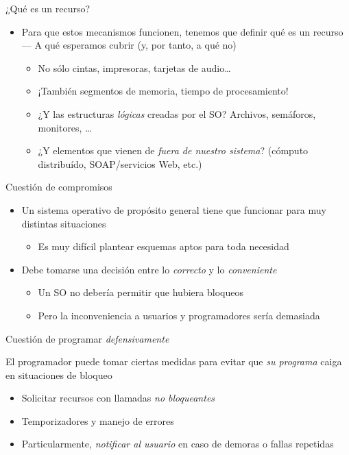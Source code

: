 \documentclass[presentation]{beamer}
\begin{document}
\begin{frame}[label={sec:org2c779b0}]{¿Qué es un recurso?}
\begin{itemize}
\item Para que estos mecanismos funcionen, tenemos que definir qué es un
recurso — A qué esperamos cubrir (y, por tanto, a qué no)
\begin{itemize}
\item No sólo cintas, impresoras, tarjetas de audio\ldots{}
\item ¡También segmentos de memoria, tiempo de procesamiento!
\item ¿Y las estructuras \emph{lógicas} creadas por el SO? Archivos,
semáforos, monitores, \ldots{}
\item ¿Y elementos que vienen de \emph{fuera de nuestro sistema}? (cómputo
distribuído, SOAP/servicios Web, etc.)
\end{itemize}
\end{itemize}
\end{frame}

\begin{frame}[label={sec:orge0f9685}]{Cuestión de compromisos}
\begin{itemize}
\item Un sistema operativo de propósito general tiene que funcionar para
muy distintas situaciones
\begin{itemize}
\item Es muy difícil plantear esquemas aptos para toda necesidad
\end{itemize}
\item Debe tomarse una decisión entre lo \emph{correcto} y lo \emph{conveniente}
\begin{itemize}
\item Un SO no debería permitir que hubiera bloqueos
\item Pero la inconveniencia a usuarios y programadores sería demasiada
\end{itemize}
\end{itemize}
\end{frame}

\begin{frame}[label={sec:orgce3633e}]{Cuestión de programar \emph{defensivamente}}
\begin{center}
El programador puede tomar ciertas medidas para evitar que \emph{su
programa} caiga en situaciones de bloqueo
\end{center}
\begin{itemize}
\item Solicitar recursos con llamadas \emph{no bloqueantes}
\item Temporizadores y manejo de errores
\item Particularmente, \emph{notificar al usuario} en caso de demoras o fallas
repetidas
\end{itemize}
\end{frame}
\end{document}
